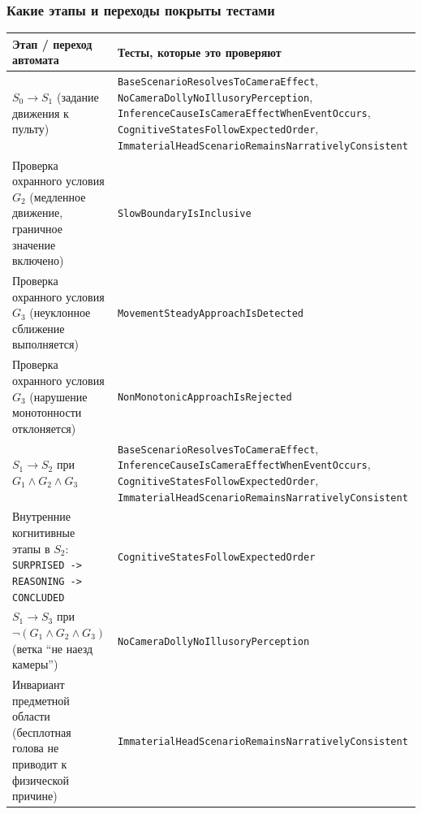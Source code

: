 \documentclass[12pt,a4paper]{report}
\begin{document}
\subsubsection*{Какие этапы и переходы покрыты тестами}
\begin{center}
\begin{tabular}{|p{6.8cm}|p{8.0cm}|}
\hline
\textbf{Этап / переход автомата} & \textbf{Тесты, которые это проверяют} \\
\hline
$S_0 \rightarrow S_1$ (задание движения к пульту) & \texttt{BaseScenarioResolvesToCameraEffect}, \texttt{NoCameraDollyNoIllusoryPerception}, \texttt{InferenceCauseIsCameraEffectWhenEventOccurs}, \texttt{CognitiveStatesFollowExpectedOrder}, \texttt{ImmaterialHeadScenarioRemainsNarrativelyConsistent} \\
\hline
Проверка охранного условия $G_2$ (медленное движение, граничное значение включено) & \texttt{SlowBoundaryIsInclusive} \\
\hline
Проверка охранного условия $G_3$ (неуклонное сближение выполняется) & \texttt{MovementSteadyApproachIsDetected} \\
\hline
Проверка охранного условия $G_3$ (нарушение монотонности отклоняется) & \texttt{NonMonotonicApproachIsRejected} \\
\hline
$S_1 \rightarrow S_2$ при $G_1 \wedge G_2 \wedge G_3$ & \texttt{BaseScenarioResolvesToCameraEffect}, \texttt{InferenceCauseIsCameraEffectWhenEventOccurs}, \texttt{CognitiveStatesFollowExpectedOrder}, \texttt{ImmaterialHeadScenarioRemainsNarrativelyConsistent} \\
\hline
Внутренние когнитивные этапы в $S_2$: \texttt{SURPRISED -> REASONING -> CONCLUDED} & \texttt{CognitiveStatesFollowExpectedOrder} \\
\hline
$S_1 \rightarrow S_3$ при $\neg(G_1 \wedge G_2 \wedge G_3)$ (ветка ``не наезд камеры'') & \texttt{NoCameraDollyNoIllusoryPerception} \\
\hline
Инвариант предметной области (бесплотная голова не приводит к физической причине) & \texttt{ImmaterialHeadScenarioRemainsNarrativelyConsistent} \\
\hline
\end{tabular}
\end{center}
\end{document}
